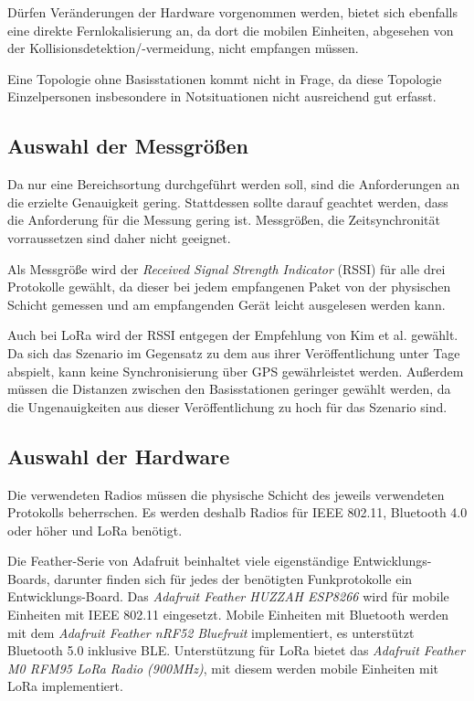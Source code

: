 Dürfen Veränderungen der Hardware vorgenommen werden, bietet sich ebenfalls eine direkte Fernlokalisierung an, da dort die mobilen Einheiten, abgesehen von der Kollisionsdetektion/-vermeidung, nicht empfangen müssen.

Eine Topologie ohne Basisstationen kommt nicht in Frage, da diese Topologie Einzelpersonen insbesondere in Notsituationen nicht ausreichend gut erfasst.




\subsection{Auswahl der Messgrößen}
Da nur eine Bereichsortung durchgeführt werden soll, sind die Anforderungen an die erzielte Genauigkeit gering.
Stattdessen sollte darauf geachtet werden, dass die Anforderung für die Messung gering ist.
Messgrößen, die Zeitsynchronität vorraussetzen sind daher nicht geeignet.

Als Messgröße wird der \emph{Received Signal Strength Indicator} (RSSI) für alle drei Protokolle gewählt, da dieser bei jedem empfangenen Paket von der physischen Schicht gemessen und am empfangenden Gerät leicht ausgelesen werden kann.

Auch bei LoRa wird der RSSI entgegen der Empfehlung von Kim et al. gewählt.
Da sich das Szenario im Gegensatz zu dem aus ihrer  Veröffentlichung unter Tage abspielt, kann keine Synchronisierung über GPS gewährleistet werden. 
Außerdem müssen die Distanzen zwischen den Basisstationen geringer gewählt werden, da die Ungenauigkeiten aus dieser Veröffentlichung zu hoch für das Szenario sind.

\subsection{Auswahl der Hardware}
Die verwendeten Radios müssen die physische Schicht des jeweils verwendeten Protokolls beherrschen.
Es werden deshalb Radios für IEEE 802.11, Bluetooth 4.0 oder höher und LoRa benötigt.

Die Feather-Serie von Adafruit beinhaltet viele eigenständige Entwicklungs-Boards, darunter finden sich für jedes der benötigten Funkprotokolle ein Entwicklungs-Board.
Das \textit{Adafruit Feather HUZZAH ESP8266} wird für mobile Einheiten mit IEEE 802.11 eingesetzt.
Mobile Einheiten mit Bluetooth werden mit dem \textit{Adafruit Feather nRF52 Bluefruit} implementiert, es unterstützt Bluetooth 5.0 inklusive BLE.
Unterstützung für LoRa bietet das \textit{Adafruit Feather M0 RFM95 LoRa Radio (900MHz)}, mit diesem werden mobile Einheiten mit LoRa implementiert.

